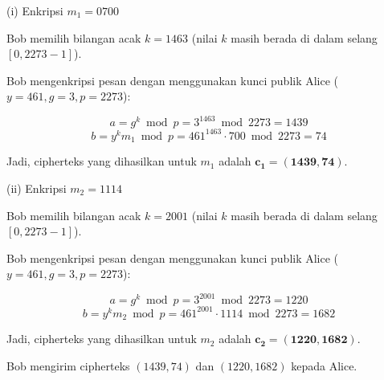 \documentclass{article}
\begin{document}

(i) Enkripsi $m_1 = 0700$

Bob memilih bilangan acak $k = 1463$ (nilai $k$ masih berada di dalam selang $[0, 2273 - 1]$).

Bob mengenkripsi pesan dengan menggunakan kunci publik Alice ($y = 461, g = 3, p = 2273$):

\[ a = g^k \bmod p = 3^{1463} \bmod 2273 = 1439 \]
\[ b = y^k m_1 \bmod p = 461^{1463} \cdot 700 \bmod 2273 = 74 \]

Jadi, cipherteks yang dihasilkan untuk $m_1$ adalah $\mathbf{c_1 = (1439, 74)}$.

\vspace{10mm}

(ii) Enkripsi $m_2 = 1114$

Bob memilih bilangan acak $k = 2001$ (nilai $k$ masih berada di dalam selang $[0, 2273 - 1]$).

Bob mengenkripsi pesan dengan menggunakan kunci publik Alice ($y = 461, g = 3, p = 2273$):

\[ a = g^k \bmod p = 3^{2001} \bmod 2273 = 1220 \]
\[ b = y^k m_2 \bmod p = 461^{2001} \cdot 1114 \bmod 2273 = 1682 \]

Jadi, cipherteks yang dihasilkan untuk $m_2$ adalah $\mathbf{c_2 = (1220, 1682)}$.

Bob mengirim cipherteks $(1439, 74)$ dan $(1220, 1682)$ kepada Alice.
\end{document}
